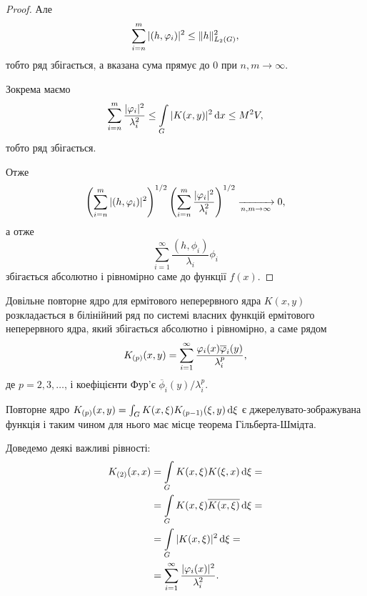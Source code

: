 \begin{proof}
	Але
	\begin{equation}
		\displaystyle\sum\limits_{i=n}^m |(h, \varphi_i)|^2 \le \|h\|_{L_2(G)}^2,
	\end{equation}
	тобто ряд збігається, а вказана сума прямує до 0 при $n, m \to \infty$.

	Зокрема маємо
	\begin{equation}
		\displaystyle\sum\limits_{i=n}^m \dfrac{|\varphi_i|^2}{\lambda_i^2} \le \displaystyle\int\limits_G |K(x, y)|^2 \mathop{}\!\mathrm{d} x \le M^2 V, 
	\end{equation}
	тобто ряд збігається. \medskip

	Отже
	\begin{equation}
		\left(\displaystyle\sum\limits_{i=n}^m |(h, \varphi_i)|^2\right)^{1/2} \left(\displaystyle\sum\limits_{i=n}^m \dfrac{|\varphi_i|^2}{\lambda_i^2}\right)^{1/2} \xrightarrow[n, m \to \infty]{} 0,
	\end{equation}
	а отже
	\begin{equation}
		\sum_{i=1}^\infty \frac{(h, \phi_i)}{\lambda_i} \phi_i
	\end{equation}
	збігається абсолютно і рівномірно саме до функції $f(x)$.
\end{proof}

\begin{corollary}
	\label{corollary:2.4.10}
	Довільне повторне ядро для ермітового неперервного ядра $K(x ,y)$ розкладається в білінійний ряд по системі власних функцій ермітового неперервного ядра, який збігається абсолютно і рівномірно, а саме рядом
	\begin{equation}
		K_{(p)}(x, y) = \displaystyle\sum\limits_{i = 1}^\infty \dfrac{\varphi_i(x) \overline {\varphi}_i(y)}{\lambda_i^p},
	\end{equation}
	де $p = 2, 3, \ldots$, і коефіцієнти Фур'є  $\overline \phi_i(y) / \lambda_i^p$.
\end{corollary}

Повторне ядро $K_{(p)}(x,y) = \int_G K(x, \xi) K_{(p - 1)} (\xi, y) \mathop{}\!\mathrm{d} \xi$ є джерелувато-зображувана функція і таким чином для нього має місце теорема Гільберта-Шмідта. \medskip

Доведемо деякі важливі рівності:
\begin{equation}
	\begin{aligned}
	K_{(2)} (x, x) &= \displaystyle\int\limits_G K(x, \xi) K(\xi, x) \mathop{}\!\mathrm{d} \xi = \\
	&= \displaystyle\int\limits_G K(x, \xi) \overline {K(x, \xi)} \mathop{}\!\mathrm{d} \xi = \\
	&= \displaystyle\int\limits_G |K(x, \xi)|^2 \mathop{}\!\mathrm{d} \xi = \\
	&= \displaystyle\sum\limits_{i = 1}^\infty \dfrac{|\varphi_i(x)|^2}{\lambda_i^2}.
	\end{aligned}
\end{equation}

